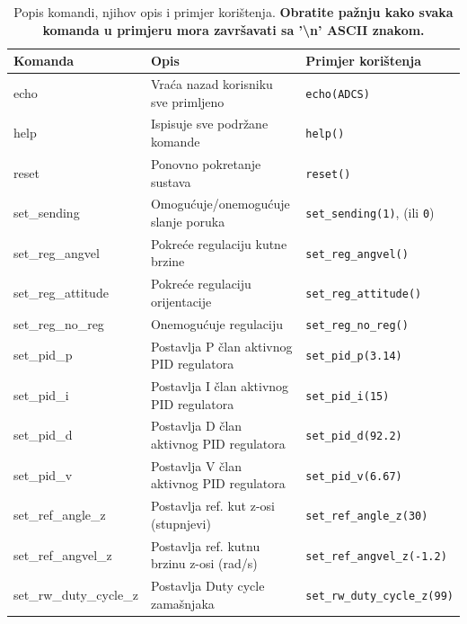 \documentclass[times, utf8, diplomski, numeric]{templates/template}
\begin{document}
{{{{                \begin{table}[htb]
                \caption{Popis komandi, njihov opis i primjer korištenja. \textbf{Obratite pažnju kako svaka komanda u primjeru mora završavati sa '\textbackslash n' ASCII znakom.}}
                \label{tbl:lista_komandi}
                \centering
                \begin{tabular}{lll} 
                \toprule
                Komanda & Opis & Primjer korištenja \\ 
                \midrule
                echo                     & Vraća nazad korisniku sve primljeno          & \texttt{echo(ADCS)}                           \\
                help                     & Ispisuje sve podržane komande                & \texttt{help()}                               \\
                reset                    & Ponovno pokretanje sustava                   & \texttt{reset()}                              \\
                set\_sending             & Omogućuje/onemogućuje slanje poruka          & \texttt{set\_sending(1)}, (ili \texttt{0})    \\
                set\_reg\_angvel         & Pokreće regulaciju kutne brzine              & \texttt{set\_reg\_angvel()}                   \\
                set\_reg\_attitude       & Pokreće regulaciju orijentacije              & \texttt{set\_reg\_attitude()}                 \\
                set\_reg\_no\_reg        & Onemogućuje regulaciju                       & \texttt{set\_reg\_no\_reg()}                  \\
                set\_pid\_p              & Postavlja P član aktivnog PID regulatora     & \texttt{set\_pid\_p(3.14)}                    \\
                set\_pid\_i              & Postavlja I član aktivnog PID regulatora     & \texttt{set\_pid\_i(15)}                      \\
                set\_pid\_d              & Postavlja D član aktivnog PID regulatora     & \texttt{set\_pid\_d(92.2)}                    \\
                set\_pid\_v              & Postavlja V član aktivnog PID regulatora     & \texttt{set\_pid\_v(6.67)}                   \\
                set\_ref\_angle\_z       & Postavlja ref. kut z-osi (stupnjevi)         & \texttt{set\_ref\_angle\_z(30)}               \\
                set\_ref\_angvel\_z      & Postavlja ref. kutnu brzinu z-osi (rad/s)    & \texttt{set\_ref\_angvel\_z(-1.2)}            \\
                set\_rw\_duty\_cycle\_z  & Postavlja Duty cycle zamašnjaka              & \texttt{set\_rw\_duty\_cycle\_z(99)}          \\
                \bottomrule
                \end{tabular}
                \end{table}

}}}}
\end{document}
